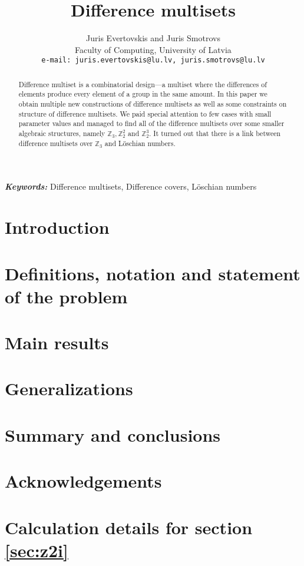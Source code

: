 \documentclass{article}
\theoremstyle{plain}
\theoremstyle{definition}
\theoremstyle{remark}
\providecommand{\keywords}[1]{\textbf{\textit{Keywords: }} #1}
\begin{document}
\title{Difference multisets}
\date{}
\author{Juris Evertovskis and Juris Smotrovs\\
\small Faculty of Computing, University of Latvia\\
{\small \tt e-mail: juris.evertovskis@lu.lv, juris.smotrovs@lu.lv}}

\maketitle
	
	\begin{abstract}
		Difference multiset is a combinatorial design---a multiset
		where the differences of elements produce every element of a group
		in the same amount. In this paper we obtain multiple new
		constructions of difference multisets as well as some constraints
		on structure of difference multisets. We paid special attention
		to few cases with small parameter values and managed to find all 
		of the difference multisets over some smaller algebraic structures,
		namely $\mathbb Z_3, \mathbb Z_2^2$ and $\mathbb Z_2^3$.
		It turned out that there is a link between difference multisets
		over $\mathbb Z_3$ and Löschian numbers.
	\end{abstract}
	
	\keywords{Difference multisets, Difference covers, Löschian numbers}
    
    \section{Introduction}
    
     
	\section{Definitions, notation and statement of the problem}
    
	
    \section{Main results}
    
	
    \section{Generalizations}
    

    \section{Summary and conclusions}
	
	
	\section{Acknowledgements}
	
    
	
	

	\appendix
	\section{Calculation details for section \ref{sec:z2i}}
	\label{sec:appendix_z2_i}
	
\end{document}
